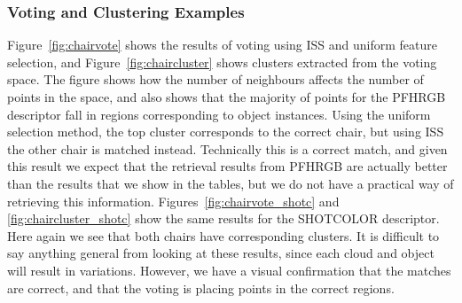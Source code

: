 \documentclass[11pt,a4paper]{kth-mag}
\begin{document}
\subsubsection{Voting and Clustering Examples}
Figure~\ref{fig:chairvote} shows the results of voting using ISS and uniform
feature selection, and Figure~\ref{fig:chaircluster} shows clusters extracted
from the voting space. The figure shows how the number of neighbours affects the
number of points in the space, and also shows that the majority of points for
the PFHRGB descriptor fall in regions corresponding to object instances. Using
the uniform selection method, the top cluster corresponds to the correct chair,
but using ISS the other chair is matched instead. Technically this is a correct
match, and given this result we expect that the retrieval results from PFHRGB
are actually better than the results that we show in the tables, but we do not
have a practical way of retrieving this information.
Figures~\ref{fig:chairvote_shotc} and \ref{fig:chaircluster_shotc} show the same
results for the SHOTCOLOR descriptor. Here again we see that both chairs have
corresponding clusters. It is difficult to say anything general from looking at
these results, since each cloud and object will result in variations. However,
we have a visual confirmation that the matches are correct, and that the voting
is placing points in the correct regions.
\end{document}
